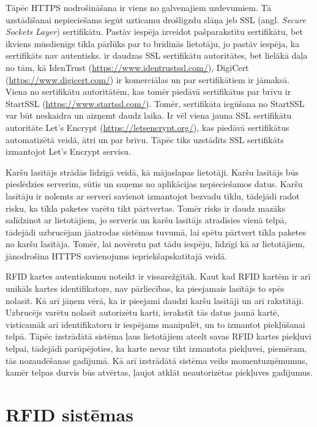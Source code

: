 Tāpēc HTTPS nodrošināšana ir viens no galvenajiem uzdevumiem. Tā uzstādīšanai nepieciešams iegūt uzticamu drošligzdu slāņa jeb SSL (angl. \textit{Secure Sockets Layer}) sertifikātu. Pastāv iespēja izveidot pašparakstītu sertifikātu, bet ikviens mūsdienīgs tīkla pārlūks par to brīdinās lietotāju, jo pastāv iespēja, ka sertifikāts nav autentisks. ir daudzas SSL sertifikātu autoritātes, bet lielākā daļa no tām, kā IdenTrust (\url{https://www.identrustssl.com/}), DigiCert (\url{https://www.digicert.com/}) ir komerciālas un par sertifikātiem ir jāmaksā. Viena no sertifikātu autoritātēm, kas tomēr piedāvā sertifikātus par brīvu ir StartSSL (\url{https://www.startssl.com/}). Tomēr, sertifikāta iegūšana no StartSSL var būt neskaidra un aizņemt daudz laika. Ir vēl viena jauna SSL sertifikātu autoritāte Let's Encrypt (\url{https://letsencrypt.org/}), kas piedāvā sertifikātus automatizētā veidā, ātri un par brīvu. Tāpēc tiks uzstādīts SSL sertifikāts izmantojot Let's Encrypt servisu.

Karšu lasītājs strādās līdzīgā veidā, kā mājaslapas lietotāji. Karšu lasītājs būs pieslēdzies serverim, sūtīs un saņems no aplikācijas nepieciešamos datus. Karšu lasītāju ir nolemts ar serveri savienot izmantojot bezvadu tīklu, tādejādi radot risku, ka tīkla paketes varētu tikt pārtvertas. Tomēr risks ir daudz mazāks salīdzinot ar lietotājiem, jo serveris un karšu lasītājs atradīsies vienā telpā, tādejādi uzbrucējam jāatrodas sistēmas tuvumā, lai spētu pārtvert tīkla paketes no karšu lasītāja. Tomēr, lai novērstu pat tādu iespēju, līdzīgi kā ar lietotājiem, jānodrošina HTTPS savienojums iepriekšapskatītajā veidā.

RFID kartes autentiskumu noteikt ir vissarežģītāk. Kaut kad RFID kartēm ir arī unikāls kartes identifikators, nav pārliecības, ka pieejamais lasītājs to spēs nolasīt. Kā arī jāņem vērā, ka ir pieejami daudzi karšu lasītāji un arī rakstītāji. Uzbrucējs varētu nolasīt autorizētu karti, ierakstīt tās datus jaunā kartē, visticamāk arī identifikatoru ir iespējams manipulēt, un to izmantot piekļūšanai telpā.
Tāpēc izstrādātā sistēma ļaus lietotājiem atcelt savas RFID kartes piekļuvi telpai, tādejādi parūpējoties, ka karte nevar tikt izmantota piekļuvei, piemēram, tās nozaudēšanas gadījumā. Kā arī izstrādātā sistēma veiks momentuzņēmumus, kamēr telpas durvis būs atvērtas, ļaujot atklāt neautorizētas piekļuves gadījumus.

\section{RFID sistēmas}
